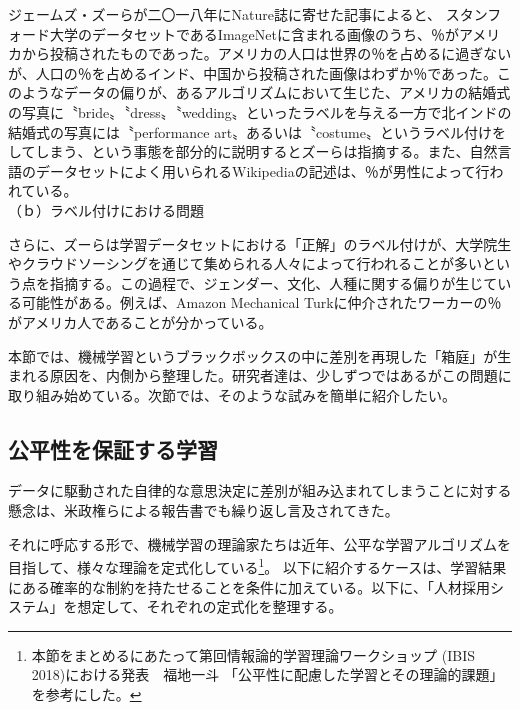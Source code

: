 \documentclass[b5j,twoside,twocolumn]{utarticle}
\newcommand{\mysubsection}[1]{\vspace{-6mm}\subsection{#1}\vspace{-2mm}}
\begin{document}
ジェームズ・ズーらが二〇一八年にNature誌に寄せた記事\cite{articleZou}によると、
スタンフォード大学のデータセットであるImageNetに含まれる画像のうち、％がアメリカから投稿されたものであった。アメリカの人口は世界の％を占めるに過ぎないが、人口の％を占めるインド、中国から投稿された画像はわずか％であった。このようなデータの偏りが、あるアルゴリズムにおいて生じた、アメリカの結婚式の写真に〝bride〟〝dress〟〝wedding〟といったラベルを与える一方で北インドの結婚式の写真には〝performance art〟あるいは〝costume〟というラベル付けをしてしまう\cite{shankar2017classification}、という事態を部分的に説明するとズーらは指摘する。また、自然言語のデータセットによく用いられるWikipediaの記述は、％が男性によって行われている\cite{inproceedings}。\\
（ｂ）ラベル付けにおける問題


さらに、ズーらは学習データセットにおける「正解」のラベル付けが、大学院生やクラウドソーシングを通じて集められる人々によって行われることが多いという点を指摘する。この過程で、ジェンダー、文化、人種に関する偏りが生じている可能性がある。例えば、Amazon Mechanical Turkに仲介されたワーカーの％がアメリカ人であることが分かっている\cite{Difallah2018DemographicsAD}。


本節では、機械学習というブラックボックスの中に差別を再現した「箱庭」が生まれる原因を、\.内\.側から整理した。研究者達は、少しずつではあるがこの問題に取り組み始めている。次節では、そのような試みを簡単に紹介したい。


\mysubsection{公平性を保証する学習}
データに駆動された自律的な意思決定に差別が組み込まれてしまうことに対する懸念は、米政権らによる報告書でも繰り返し言及されてきた\cite{obama}\cite{obama2}。

それに呼応する形で、機械学習の理論家たちは近年、公平な学習アルゴリズムを目指して、様々な理論を定式化している\footnote{本節をまとめるにあたって第回情報論的学習理論ワークショップ (IBIS 2018)における発表　福地一斗 「公平性に配慮した学習とその理論的課題」を参考にした。}。
以下に紹介するケースは、学習結果にある確率的な制約を持たせることを条件に加えている。以下に、「人材採用システム」を想定して、それぞれの定式化を整理する。
\end{document}
